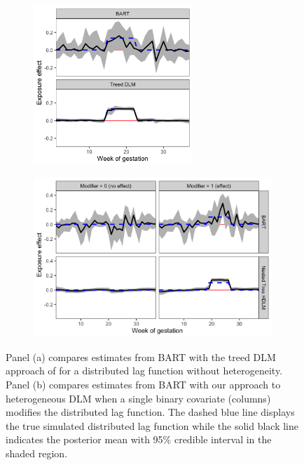\documentclass[12pt]{article}
\begin{document}
\begin{figure}[!ht]
    \centering
    \begin{subfigure}{0.39\textwidth}
        \centering
        \includegraphics[height=6cm]{img/bart_vs_tdlm.png}
        \caption{}
        \label{fig:bart_vs_tdlm}
    \end{subfigure}
    \begin{subfigure}{0.59\textwidth}
        \centering
        \includegraphics[height=6cm]{img/bart_vs_hdlm.png}
        \caption{}
        \label{fig:bart_vs_hdlm}
    \end{subfigure}
    \caption{Panel (a) compares estimates from BART with the treed DLM approach of \cite{Mork2023EstimatingPairs} for a distributed lag function without heterogeneity. Panel (b) compares estimates from BART with our approach to heterogeneous DLM when a single binary covariate (columns) modifies the distributed lag function. The dashed blue line displays the true simulated distributed lag function while the solid black line indicates the posterior mean with 95\% credible interval in the shaded region.}
    \label{fig:scen4_5}
\end{figure}
\end{document}
